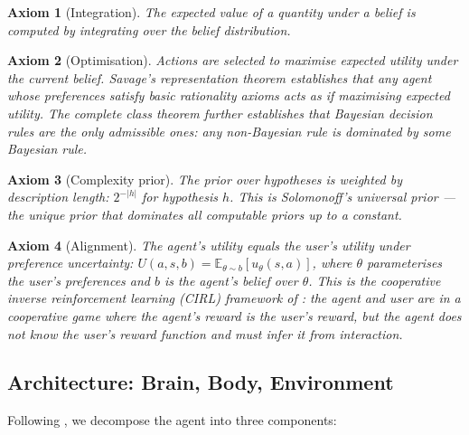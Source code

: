 \documentclass[11pt]{article}
\newcommand{\E}{\mathbb{E}}
\newtheorem{axiom}{Axiom}
\begin{document}
\begin{axiom}[Integration]
The expected value of a quantity under a belief is computed by integrating over the belief distribution.
\end{axiom}

\begin{axiom}[Optimisation]
Actions are selected to maximise expected utility under the current belief. Savage's representation theorem \citep{savage1954foundations} establishes that any agent whose preferences satisfy basic rationality axioms acts as if maximising expected utility. The complete class theorem \citep{wald1950statistical, berger1985statistical} further establishes that Bayesian decision rules are the only admissible ones: any non-Bayesian rule is dominated by some Bayesian rule.
\end{axiom}

\begin{axiom}[Complexity prior]
The prior over hypotheses is weighted by description length: $2^{-|h|}$ for hypothesis $h$. This is Solomonoff's universal prior \citep{solomonoff1964formal}---the unique prior that dominates all computable priors up to a constant.
\end{axiom}

\begin{axiom}[Alignment]
The agent's utility equals the user's utility under preference uncertainty: $U(a, s, b) = \E_{\theta \sim b}[u_\theta(s, a)]$, where $\theta$ parameterises the user's preferences and $b$ is the agent's belief over $\theta$. This is the cooperative inverse reinforcement learning (CIRL) framework of \citet{hadfield2016cooperative}: the agent and user are in a cooperative game where the agent's reward is the user's reward, but the agent does not know the user's reward function and must infer it from interaction.
\end{axiom}

\subsection{Architecture: Brain, Body, Environment}
\label{sec:architecture}

Following \citet{ay2015geometric}, we decompose the agent into three components:
\end{document}
